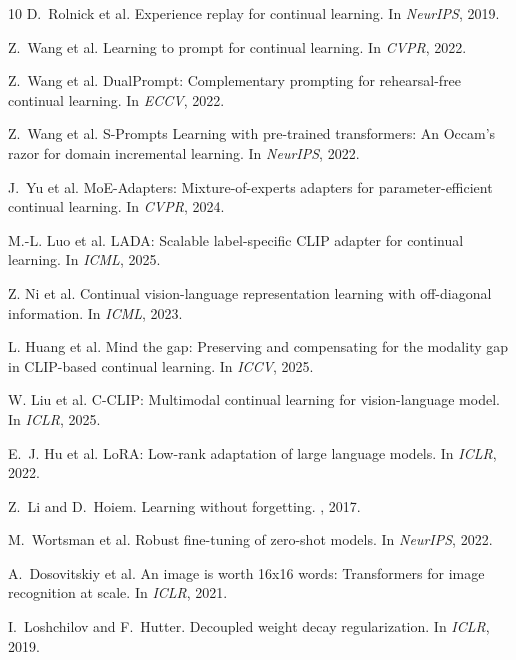 \documentclass{article}
\begin{document}
\begin{thebibliography}{10}
D.~Rolnick et al.
\newblock Experience replay for continual learning.
\newblock In {\em NeurIPS}, 2019.

Z.~Wang et al.
\newblock Learning to prompt for continual learning.
\newblock In {\em CVPR}, 2022.

Z.~Wang et al.
\newblock DualPrompt: Complementary prompting for rehearsal-free continual learning.
\newblock In {\em ECCV}, 2022.

Z.~Wang et al.
\newblock S-Prompts Learning with pre-trained transformers: An Occam's razor for domain incremental learning.
\newblock In {\em NeurIPS}, 2022.

J.~Yu et al.
\newblock MoE-Adapters: Mixture-of-experts adapters for parameter-efficient continual learning.
\newblock In {\em CVPR}, 2024.

M.-L. Luo et al.
\newblock LADA: Scalable label-specific CLIP adapter for continual learning.
\newblock In {\em ICML}, 2025.

Z. Ni et al.
\newblock Continual vision-language representation learning with off-diagonal information.
\newblock In {\em ICML}, 2023.

L. Huang et al.
\newblock Mind the gap: Preserving and compensating for the modality gap in CLIP-based continual learning.
\newblock In {\em ICCV}, 2025.

W. Liu et al.
\newblock C-CLIP: Multimodal continual learning for vision-language model.
\newblock In {\em ICLR}, 2025.

E.~J. Hu et al.
\newblock LoRA: Low-rank adaptation of large language models.
\newblock In {\em ICLR}, 2022.

Z.~Li and D.~Hoiem.
\newblock Learning without forgetting.
, 2017.

M.~Wortsman et al.
\newblock Robust fine-tuning of zero-shot models.
\newblock In {\em NeurIPS}, 2022.

A.~Dosovitskiy et al.
\newblock An image is worth 16x16 words: Transformers for image recognition at scale.
\newblock In {\em ICLR}, 2021.

I.~Loshchilov and F.~Hutter.
\newblock Decoupled weight decay regularization.
\newblock In {\em ICLR}, 2019.


\end{thebibliography}
\end{document}
